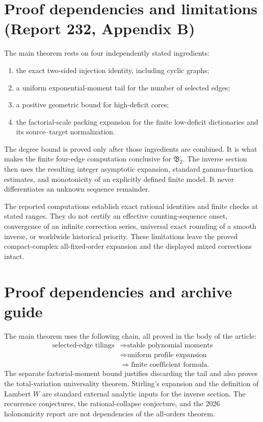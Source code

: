 \documentclass[11pt]{article}
\numberwithin{equation}{section}
\theoremstyle{definition}
\theoremstyle{remark}
\theoremstyle{definition}
\begin{document}
\section{Proof dependencies and limitations (Report 232, Appendix B)}
\label{spf:cg:app:dependencies}

The main theorem rests on four independently stated ingredients:
\begin{enumerate}
 \item the exact two-sided injection identity, including cyclic graphs;
 \item a uniform exponential-moment tail for the number of selected edges;
 \item a positive geometric bound for high-deficit cores;
 \item the factorial-scale packing expansion for the finite low-deficit
       dictionaries and its source--target normalization.
\end{enumerate}
The degree bound is proved only after those ingredients are combined.
It is what makes the finite four-edge computation conclusive for
$\mathfrak B_2$. The inverse section then uses the resulting integer
asymptotic expansion, standard gamma-function estimates, and monotonicity of
an explicitly defined finite model. It never differentiates an unknown
sequence remainder.

The reported computations establish exact rational identities and finite
checks at stated ranges. They do not certify an effective counting-sequence
onset, convergence of an infinite correction series, universal exact
rounding of a smooth inverse, or worldwide historical priority. These
limitations leave the proved compact-complex all-fixed-order expansion and
the displayed mixed corrections intact.


\appendix
\section{Proof dependencies and archive guide}

The main theorem uses the following chain, all proved in the body of the
article:
\begin{equation*}
 \begin{aligned}
 \text{selected-edge tilings}
 &\Longrightarrow \text{stable polynomial moments}\\
 &\Longrightarrow \text{uniform profile expansion}\\
 &\Longrightarrow \text{finite coefficient formula}.
 \end{aligned}
\end{equation*}
The separate factorial-moment bound justifies discarding the tail and also
proves the total-variation universality theorem. Stirling's expansion and the
definition of Lambert $W$ are standard external analytic inputs for the inverse
section. The recurrence conjectures, the rational-collapse conjecture, and the
2026 holonomicity report are not dependencies of the all-orders theorem.
\end{document}
